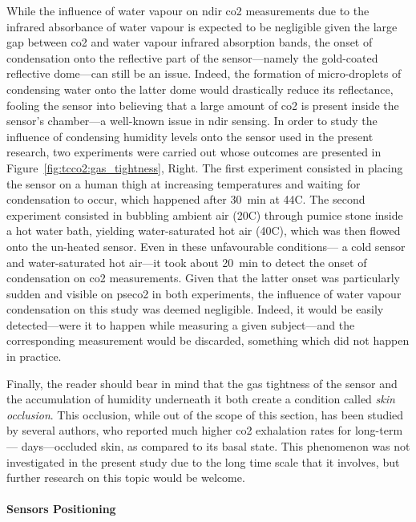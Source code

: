 While the influence of water vapour on \gls{ndir} \gls{co2} measurements due to the infrared absorbance of water vapour is expected to be negligible given the large gap between \gls{co2} and water vapour infrared absorption bands\cite{se_ndir_co2}, the onset of condensation onto the reflective part of the sensor---namely the gold-coated reflective dome---can still be an issue. Indeed, the formation of micro-droplets of condensing water onto the latter dome would drastically reduce its reflectance, fooling the sensor into believing that a large amount of \gls{co2} is present inside the sensor's chamber---a well-known issue in \gls{ndir} sensing\cite{fietzek2014, wang2018}. In order to study the influence of condensing humidity levels onto the sensor used in the present research, two experiments were carried out whose outcomes are presented in Figure~\ref{fig:tcco2:gas_tightness}, Right. The first experiment consisted in placing the sensor on a human thigh at increasing temperatures and waiting for condensation to occur, which happened after 30~min at 44{\degree}C. The second experiment consisted in bubbling ambient air (20{\degree}C) through pumice stone inside a hot water bath, yielding water-saturated hot air (40{\degree}C), which was then flowed onto the un-heated sensor. Even in these unfavourable conditions---\ie{} a cold sensor and water-saturated hot air---it took about 20~min to detect the onset of condensation on \gls{co2} measurements. Given that the latter onset was particularly sudden and visible on \gls{pseco2} in both experiments, the influence of water vapour condensation on this study was deemed negligible. Indeed, it would be easily detected---were it to happen while measuring a given subject---and the corresponding measurement would be discarded, something which did not happen in practice.

Finally, the reader should bear in mind that the gas tightness of the sensor and the accumulation of humidity underneath it both create a condition called \emph{skin occlusion}. This occlusion, while out of the scope of this section, has been studied by several authors\cite{frame1972, king1978, faergemann1983}, who reported much higher \gls{co2} exhalation rates for long-term---\ie{} days---occluded skin, as compared to its basal state. \mfrin{}This phenomenon was not investigated in the present study due to the long time scale that it involves, but further research on this topic would be welcome.

\paragraph{Sensors Positioning}\label{sect:tcco2:frontiers:sensor_pos}\makebox{}\\

